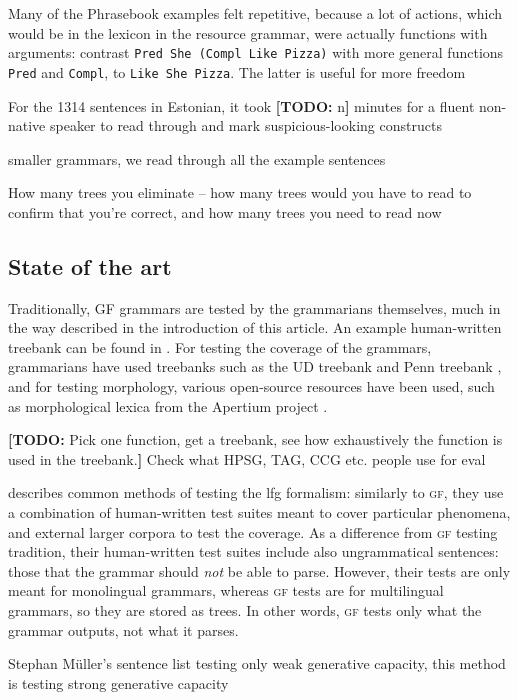 \documentclass[11pt]{article}
\def\t#1{\texttt{#1}}
\def\gf{\textsc{gf}}
\newcommand{\todo}[1]{{\color{cyan}\textbf{[TODO: }#1\textbf{]}}}
\begin{document}
Many of the Phrasebook examples felt repetitive, because a lot of
actions, which would be in the lexicon in the resource grammar, were
actually functions with arguments: contrast  \t{Pred She (Compl Like
  Pizza)} with more general functions \t{Pred} and \t{Compl}, to
\t{Like She Pizza}. The latter is useful for more freedom


For the 1314 sentences in Estonian, it took \todo{n} minutes for a
fluent non-native speaker to read through and mark suspicious-looking constructs

smaller grammars, we read through all the example sentences

How many trees you eliminate -- how many trees would you have to read
to confirm that you're correct, and how many trees you need to read
now

\subsection{State of the art}

Traditionally, GF grammars are tested by the grammarians themselves,
much in the way described in the introduction of this article. An example
human-written treebank can be found in \cite[p.~136--142]{khegai2006phd}.
For testing the coverage of the grammars, grammarians have used
treebanks such as the UD treebank \cite{nivre2016ud} and Penn treebank
\cite{marcus1993penntreebank}, and for testing morphology, various open-source resources
have been used, such as morphological lexica from the Apertium
project \cite{forcada2011apertium}.

\todo{Pick one function, get a treebank, see how exhaustively the function
is used in the treebank.}
Check what HPSG, TAG, CCG etc. people use for eval

\cite[pp.~212--213]{butt1999lfg} describes common methods of testing the
{\sc lfg} formalism: similarly to \gf, they use a combination of
human-written test suites meant to cover particular phenomena, and
external larger corpora to test the coverage. As a difference from \gf{}
testing tradition, their human-written test suites include also
ungrammatical sentences: those that the grammar should \emph{not} be
able to parse. However, their tests are only meant for monolingual
grammars, whereas \gf{} tests are for multilingual grammars, so they are
stored as trees. In other words, \gf{} tests only what the grammar
outputs, not what it parses.

Stephan Müller's sentence list testing only weak generative capacity,
this method is testing strong generative capacity
\end{document}
